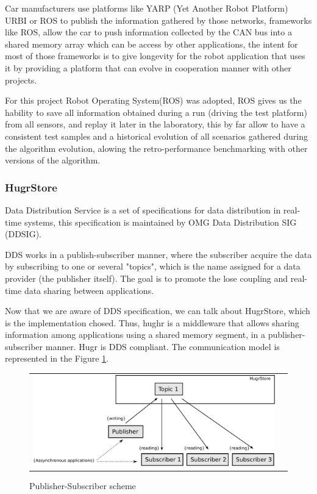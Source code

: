 Car manufacturers use platforms like YARP (Yet Another Robot Platform) URBI or ROS to publish the information gathered by those networks, frameworks like ROS, allow the car to push information collected by the CAN bus into a shared memory array which can be access by other applications, the intent for most of those frameworks is to give longevity\cite{Fitzpatrick:2008:TLR:1327539.1327705} for the robot application that uses it by providing a platform that can evolve in cooperation manner with other projects.

For this project Robot Operating System(ROS) was adopted, ROS gives us the hability to save all information obtained during a run (driving the test platform) from all sensors, and replay it later in the laboratory, this by far allow to have a consistent test samples and a historical evolution of all scenarios gathered during the algorithm evolution, alowing the retro-performance benchmarking with other versions of the algorithm.

\subsubsection*{HugrStore}

Data Distribution Service\cite{dds} is a set of specifications for data distribution in real-time systems, this specification is maintained by OMG Data Distribution SIG (DDSIG).

DDS works in a publish-subscriber manner, where the subscriber acquire the data by subscribing to one or several  "topics", which is the name assigned for a data provider (the publisher itself). The goal is to promote the lose coupling and real-time data sharing between applications.

Now that we are aware of DDS specification, we can talk about HugrStore, which is the implementation chosed. Thus, hughr is a middleware that allows sharing information among applications using a shared memory segment, in a publisher-subscriber manner. Hugr is DDS compliant. The communication model is represented in the Figure \ref{fig:dds:hugr}.

\begin{figure}[H]
   \centering
     \begin{tabular}{lr}
       \includegraphics[scale=0.50]{img/fig:dds:hugr}
     \end{tabular}
   \caption{Publisher-Subscriber scheme}
   \label{fig:dds:hugr}
\end{figure}


